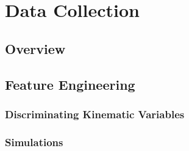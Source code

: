 \chapter{Data Collection}
\section{Overview}
\section{Feature Engineering}
\subsection{Discriminating Kinematic Variables}
\subsection{Simulations}
